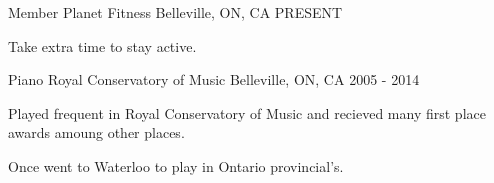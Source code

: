 

\begin{cventries}
	
	\cventry
	{Member} %
	{Planet Fitness} %
	{Belleville, ON, CA} %
	{PRESENT} %
	{
		\begin{cvitems} %
			\item {Take extra time to stay active.}
		\end{cvitems}
	}
	
	\cventry
	{Piano} %
	{Royal Conservatory of Music} %
	{Belleville, ON, CA} %
	{2005 - 2014} %
	{
		\begin{cvitems} %
			\item {Played frequent in Royal Conservatory of Music and recieved many first place awards amoung other places.}
			\item {Once went to Waterloo to play in Ontario provincial's.}
		\end{cvitems}
	}
	
\end{cventries}
